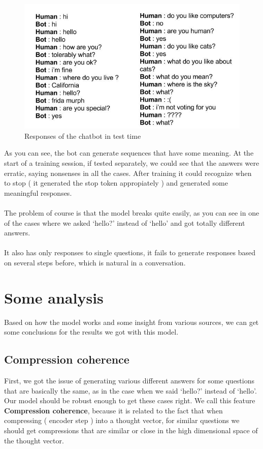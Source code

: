 \documentclass{llncs}
\begin{document}
\begin{figure}[H]
    \centering
    \includegraphics[scale=0.5]{../_img/img_chatbotLogs.jpg}
    \caption{Responses of the chatbot in test time}
    \label{fig:img_chatbotLogs}
\end{figure}

As you can see, the bot can generate sequences that have some meaning. At the start of a training session, if tested separately, we could see that the answers were erratic, saying nonsenses in all the cases. After training it could recognize when to stop ( it generated the stop token appropiately ) and generated some meaningful responses.
\\
\\
The problem of course is that the model breaks quite easily, as you can see in one of the cases where we asked `hello?' instead of `hello' and got totally different answers. 
\\
\\
It also has only responses to single questions, it fails to generate responses based on several steps before, which is natural in a conversation.

\section{Some analysis}

Based on how the model works and some insight from various sources, we can get some conclusions for the results we got with this model.
\\
\subsection{Compression coherence}

First, we got the issue of generating various different answers for some questions that are basically the same, as in the case when we said `hello?' instead of `hello'.
Our model should be robust enough to get these cases right. We call this feature \textbf{Compression coherence}, because it is related to the fact that when compressing ( encoder step ) into a thought vector, for similar questions we should get compressions that are similar or close in the high dimensional space of the thought vector.
\end{document}
